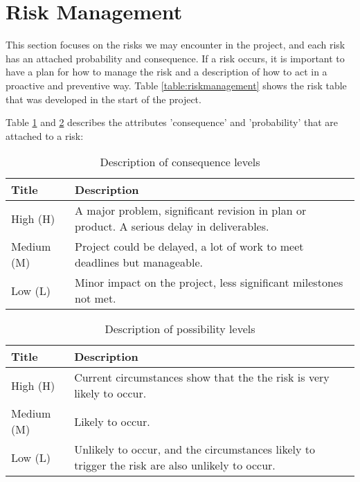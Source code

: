 
\pagestyle{fancy}
\clearpage
\section{Risk Management}

This section focuses on the risks we may encounter in the project, and each risk has an attached probability and consequence. If a risk occurs, it is important to have a plan for how to manage the risk and a description of how to act in a proactive and preventive way. Table \ref{table:riskmanagement} shows the risk table that was developed in the start of the project.

Table \ref{table:consequencelevels} and \ref{table:possibilitylevels} describes the attributes 'consequence' 
and 'probability' that are attached to a risk:


\begin{table}[H]
\begin{tabular}{| p{3cm} | p{8cm} |}
  \hline
  \rowcolor{gray}
  {\bf Title} & {\bf Description} \\ \hline
    High (H) & A major problem, significant revision in plan or product. 
    A serious delay in deliverables.\\ \hline
    Medium (M) & Project could be delayed, a lot of work to meet deadlines but
    manageable.\\ \hline
    Low (L) & Minor impact on the project, less significant milestones not met.\\ \hline
\end{tabular}
\caption{Description of consequence levels}
\label{table:consequencelevels}
\end{table}

\begin{table}[H]
\begin{tabular}{| p{3cm} | p{8cm} |}
  \hline
  \rowcolor{gray}
    {\bf Title} & {\bf Description} \\ \hline
    High (H) & Current circumstances show that the the risk is very 
    likely to occur.\\ \hline
    Medium (M) & Likely to occur.\\ \hline
    Low (L) & Unlikely to occur, and the circumstances likely to trigger 
    the risk are also unlikely to occur.\\ \hline
\end{tabular}
\caption{Description of possibility levels}
\label{table:possibilitylevels}
\end{table}

